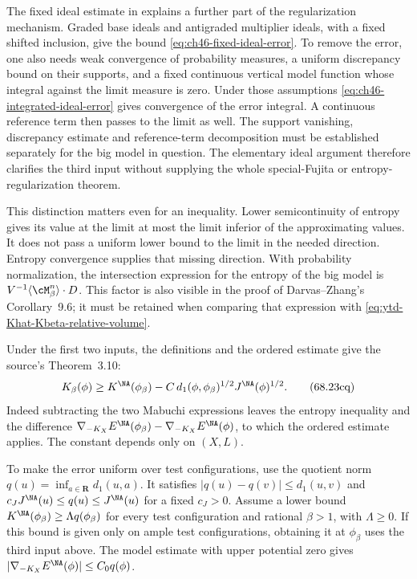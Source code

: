 The fixed ideal estimate in 
explains a further part of the regularization mechanism. Graded base
ideals and antigraded multiplier ideals, with a fixed shifted inclusion,
give the bound \eqref{eq:ch46-fixed-ideal-error}. To remove the error,
one also needs weak convergence of probability measures, a uniform
discrepancy bound on their supports, and a fixed continuous vertical
model function whose integral against the limit measure is zero.
Under those assumptions \eqref{eq:ch46-integrated-ideal-error}
gives convergence of the error integral. A continuous reference term
then passes to the limit as well. The support vanishing, discrepancy
estimate and reference-term decomposition must be established
separately for the big model in question. The elementary ideal
argument therefore clarifies the third input without supplying the
whole special-Fujita or entropy-regularization theorem.

This distinction matters even for an inequality. Lower semicontinuity
of entropy gives its value at the limit at most the limit inferior
of the approximating values. It does not pass a uniform lower bound
to the limit in the needed direction. Entropy convergence supplies
that missing direction. With probability normalization, the
intersection expression for the entropy of the big model is
$V^{-1}\langle\cM_\beta^n\rangle\cdot D$.
This factor is also visible in the proof of Darvas--Zhang's
Corollary~9.6; it must be retained when comparing that expression
with \eqref{eq:ytd-Khat-Kbeta-relative-volume}.

Under the first two inputs, the definitions and the ordered estimate
give the source's Theorem~3.10:
\[
 K_\beta(\phi)\geq K^{\NA}(\phi_\beta)
     -C\,d_1(\phi,\phi_\beta)^{1/2}J^{\NA}(\phi)^{1/2}.
\tag{68.23cq}\label{eq:ytd-Khat-Kbeta-functional-comparison}
\]
Indeed subtracting the two Mabuchi expressions leaves the entropy
inequality and the difference
$\nabla_{-K_X}E^{\NA}(\phi_\beta)
-\nabla_{-K_X}E^{\NA}(\phi)$, to which the ordered estimate applies.
The constant depends only on $(X,L)$.

To make the error uniform over test configurations, use the quotient
norm $q(u)=\inf_{a\in\mathbf R}d_1(u,a)$.
It satisfies $|q(u)-q(v)|\leq d_1(u,v)$ and
$c_JJ^{\NA}(u)\leq q(u)\leq J^{\NA}(u)$ for a fixed $c_J>0$.
Assume a lower bound
$K^{\NA}(\phi_\beta)\geq\Lambda q(\phi_\beta)$ for every
test configuration and rational $\beta>1$, with $\Lambda\geq0$.
If this bound is given only on ample test configurations, obtaining
it at $\phi_\beta$ uses the third input above.
The model estimate with upper potential zero gives
$|\nabla_{-K_X}E^{\NA}(\phi)|\leq C_0q(\phi)$.


